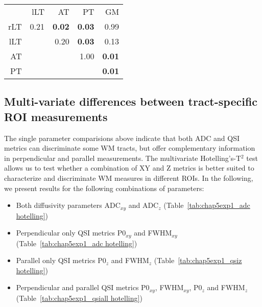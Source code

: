 \begin{table}
{\begin{minipage}{\linewidth}
\begin{tabular}{rrrrr}
  				    \bottomrule
  				    \end{tabular}%
  	  			    \hspace{0.5cm}
  				    \begin{tabular}{rrrrr}
  				    \addlinespace
					\multicolumn{5}{c}{\textbf{FWHM$_{z}$}}\\		
					\toprule
  				          & lLT  & AT    & PT    & GM \\
  				    \midrule
  				    rLT  & 0.21  & \textbf{0.02}  & \textbf{0.03}  & 0.99 \\
  				    lLT  &       & 0.20  & \textbf{0.03}  & 0.13 \\
  				    AT    &       &       & 1.00  & \textbf{0.01} \\
  				    PT    &       &       &       & \textbf{0.01} \\
  				    \bottomrule
  				    \end{tabular}%
  				\end{minipage}%
  	  	  	  }
\end{table}%

\subsection{Multi-variate differences between tract-specific ROI measurements}
The single parameter comparisions above indicate that both \gls{ADC} and \gls{QSI} metrics can discriminate some WM tracts, but offer complementary information in perpendicular and parallel measurements. The multivariate Hotelling's-T$^2$ test allows us to test whether a combination of XY and Z metrics is better suited to characterize and discriminate WM measures in different \glspl{ROI}. In the following, we present results for the following combinations of parameters:
\begin{itemize}
    \item Both diffusivity parameters ADC$_{xy}$ and ADC$_z$ (Table~\ref{tab:chap5exp1_adc hotelling})
    \item Perpendicular only \gls{QSI} metrics P0$_{xy}$ and FWHM$_{xy}$ (Table~\ref{tab:chap5exp1_adc hotelling})
    \item Parallel only \gls{QSI} metrics P0$_z$ and FWHM$_z$ (Table~\ref{tab:chap5exp1_qsiz hotelling})
    \item Perpendicular and parallel \gls{QSI} metrics P0$_{xy}$, FWHM$_{xy}$, P0$_z$ and FWHM$_z$ (Table~\ref{tab:chap5exp1_qsiall hotelling})
\end{itemize}


